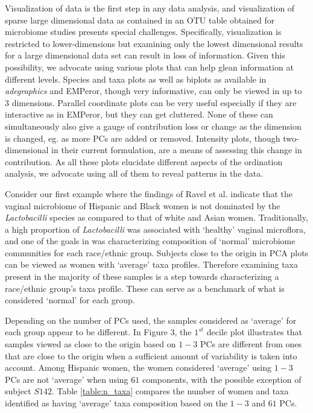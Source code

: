 \documentclass[doublespacing]{bmcart}
\begin{document}
Visualization of data is the first step in any data analysis, and visualization of sparse large dimensional data as contained in an OTU table obtained for microbiome studies presents special challenges. Specifically, visualization is restricted to lower-dimensions but examining only the lowest dimensional results for a large dimensional data set can result in loss of information. Given this possibility, we advocate using various plots that can help glean information at different levels. Species and taxa plots as well as biplots as available in \textit{adegraphics} and EMPeror, though very informative, can only be viewed in up to 3 dimensions. Parallel coordinate plots can be very useful especially if they are interactive as in EMPeror, but they can get cluttered. None of these can simultaneously also give a gauge of contribution loss or change as the dimension is changed, eg. as more PCs are added or removed. Intensity plots, though two-dimensional in their current formulation, are a means of assessing this change in contribution. As all these plots elucidate different aspects of the ordination analysis, we advocate using all of them to reveal patterns in the data.

Consider our first example where the findings of  Ravel et al.  \cite{Ravel} indicate that the vaginal microbiome of Hispanic and Black women is not dominated by the \textit{Lactobacilli} species as compared to that of white and Asian women. Traditionally, a high proportion of \textit{Lactobacilli} was associated with `healthy' vaginal microflora, and  one of the goals in  \cite{Ravel} was characterizing composition of `normal' microbiome communities for each race/ethnic group. Subjects close to the origin in PCA plots can be viewed as women with `average' taxa profiles. Therefore examining taxa present in the majority of these samples is a step towards characterizing a race/ethnic group's  taxa profile.  These can serve as a benchmark of what is considered `normal' for each group.    

Depending on the number of PCs used, the samples considered as `average' for each group appear to be different. In Figure 3, the $1^{st}$ decile plot illustrates that samples viewed as close to the origin based on $1-3$ PCs are different from ones that are close to the origin when a sufficient amount of variability is taken into account. Among Hispanic women, the women considered `average' using $1-3$ PCs are not `average' when using $61$ components, with the possible exception of subject $S142$. Table \ref{table:n_taxa} compares the number of women and taxa identified as having `average' taxa composition based on the $1-3$ and $61$ PCs.  
\end{document}
